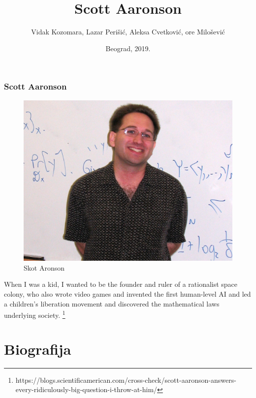 \documentclass{beamer}
\def\dJ{{\fontencoding{T1}\selectfont\dj}}
\def\Dj{{\fontencoding{T1}\selectfont\DJ}}
\begin{document}
\title{Scott Aaronson}
\author{Vidak Kozomara, Lazar Perišić, Aleksa Cvetković, \newline \Dj{}or\dJ{}e Milošević}
\date{
	\footnotesize{Beograd, 2019.}	
}

\begin{frame}
	\thispagestyle{empty}
	\titlepage
\end{frame}

\addtocounter{framenumber}{-1}
\begin{frame}[fragile]\frametitle{Scott Aaronson}
	\begin{figure}
		\includegraphics[scale=0.2]{Scott Aaronson.jpg}
		\caption{Skot Aronson}
		\end{figure}
	\begin{displayquote}
		When I was a kid, I wanted to be the founder and ruler of a rationalist space colony, who also wrote video games and invented the first human-level AI and led a children’s liberation movement and discovered the mathematical laws underlying society.
		\footnote{https://blogs.scientificamerican.com/cross-check/scott-aaronson-answers-every-ridiculously-big-question-i-throw-at-him/}
		\end{displayquote}

\end{frame}

\section{Biografija}
\end{document}
